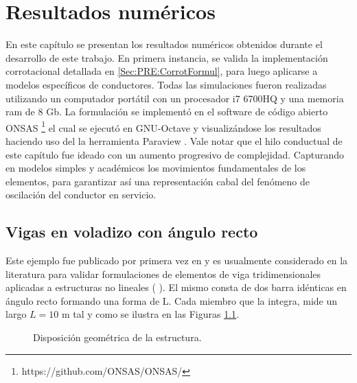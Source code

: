 \chapter{Resultados numéricos}\label{Cap:ResultadosNumericos}
\linenumbers
En este capítulo se presentan los resultados numéricos obtenidos durante el desarrollo de este trabajo. En primera instancia,  se valida la implementación corrotacional detallada en \ref{Sec:PRE:CorrotFormul}, para luego aplicarse a modelos específicos de conductores. Todas las simulaciones fueron realizadas utilizando un computador portátil con un procesador i7 6700HQ y una memoria ram de 8 Gb. La formulación se implementó en el software de código abierto ONSAS \footnote{https://github.com/ONSAS/ONSAS/} el cual se ejecutó en GNU-Octave  \textcite{Octave}y visualizándose los resultados haciendo uso del la herramienta Paraview \textcite{squillacote2007paraview}. Vale notar que el hilo conductual de este capítulo fue ideado con un aumento progresivo de complejidad. Capturando en modelos simples y académicos los movimientos fundamentales de los elementos, para garantizar así una representación cabal del fenómeno de oscilación del conductor en servicio. 


\section{Vigas en voladizo con ángulo recto}\label{sec:RN:RightAngle}
Este ejemplo fue publicado por primera vez en \cite{simo1988dynamics} y es usualmente considerado en la literatura para validar formulaciones de elementos de viga tridimensionales aplicadas a estructuras no lineales (\cite{albino2018co} \cite{Le2014}). El mismo consta de dos barra idénticas en ángulo recto formando una forma de L. Cada miembro que la integra, mide un largo $L=10$ m tal y como se ilustra en las Figuras \ref{fig:RN:RA:esquemas}.


\begingroup
\centering
\begin{figure}[htbp]
	\centering
	\label{fig:RN:RA:Ilusxy}
	\label{fig:RN:RA:Ilusyz}
	\caption{Disposición geométrica de la estructura.} 	\label{fig:RN:RA:esquemas}
\end{figure}
\endgroup



